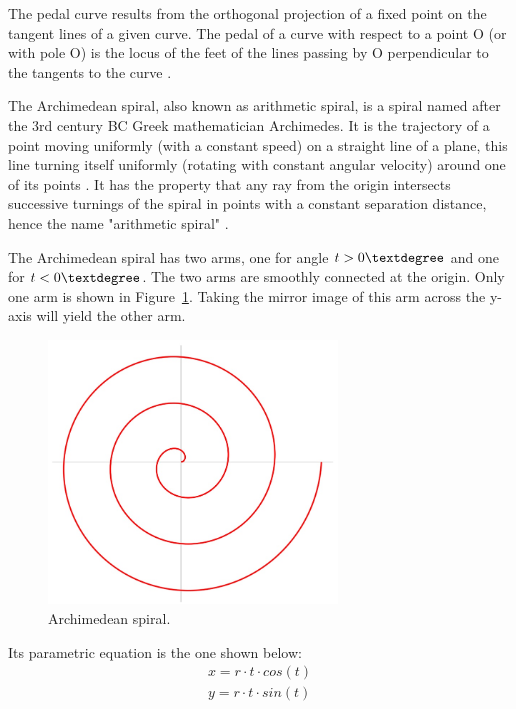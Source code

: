 The pedal curve results from the orthogonal projection of a fixed point on the tangent lines of a given curve. The pedal of a curve with respect to a point O (or with pole O) is the locus of the feet of the lines passing by O perpendicular to the tangents to the curve \cite{weisstein2003pedal}. 

The Archimedean spiral, also known as arithmetic spiral,  is a spiral named after the 3rd century BC Greek mathematician Archimedes. It is the trajectory of a point moving uniformly (with a constant speed) on a straight line of a plane, this line turning itself uniformly (rotating with constant angular velocity) around one of its points \cite{sloane}. It has the property that any ray from the origin intersects successive turnings of the spiral in points with a constant separation distance, hence the name "arithmetic spiral" \cite{holland1957archimedes}.

The Archimedean spiral has two arms, one for angle $t > 0\textdegree$ and one for $t < 0\textdegree$. The two arms are smoothly connected at the origin. Only one arm is shown in Figure~\ref{fig:spiral}. Taking the mirror image of this arm across the y-axis will yield the other arm.

\begin{figure}[htbp]
	\centering
	\includegraphics[height=70mm]{chapters/figures/motion_planning/spiral.jpg}
	\caption{Archimedean spiral.}
	\label{fig:spiral}
\end{figure}

Its parametric equation is the one shown below:
\begin{equation*}
\begin{split}
x = r \cdot t \cdot cos(t) \\ 
y = r \cdot t \cdot sin(t)
\end{split}
\end{equation*}

